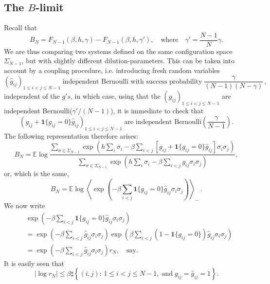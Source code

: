 \documentclass[a4paper,12pt,oneside,reqno]{amsart}
\numberwithin{equation}{section}
\begin{document}
\subsection{The $B$-limit} 
Recall that 
\[
B_N = F_{N-1}({\beta}, h, \gamma) - F_{N-1}({\beta}, h, \gamma'), \quad \text{where}\quad \gamma' = \frac{N-1}{N} \gamma.
\]
We are thus comparing two systems defined on the same configuration space $\Sigma_{N-1}$, but with slightly different dilution-parameters. This can be taken into account by a coupling procedure, i.e. introducing fresh random variables
$$(\hat g_{ij})_{1\leq i<j\leq N-1} \;    \text{independent Bernoulli with success probability}\;  \frac{\gamma}{(N-1)(N-\gamma)}\,,$$ 
independent of the $g's$, in which case, using that  the $ (g_{ij})_{1\leq i<j\leq N-1}$ are independent Bernoulli($\gamma'/\left(N-1\right) $), it is immediate to check that  
$$\left(g_{ij} + \boldsymbol{1}\{g_{ij} = 0\} \hat g_{ij}\right)_{1\leq i<j\leq N-1} \; \text{are independent Bernoulli}\left(\frac{\gamma}{ N-1} \right).$$
The following representation therefore arises: 
\[
B_N = {{\mathbb{E}}} \log \frac{\sum_{{\sigma} \in \Sigma_{N-1}} \exp\left( h \sum_i {\sigma}_i - {\beta} \sum_{i<j} \left[ g_{ij} + \boldsymbol{1}\{g_{ij} = 0\} \hat g_{ij} \right]  {\sigma}_i {\sigma}_j\right)  }{ \sum_{{\sigma} \in \Sigma_{N-1}} \exp\left(h \sum_i {\sigma}_i  - {\beta} \sum_{i<j} g_{ij} {\sigma}_i {\sigma}_j \right) },
\]
or, which is the same, 
\begin{equation} \label{reform_b}
B_N = {{\mathbb{E}}} \log \left< \exp\left( -  {\beta} \sum_{i<j}  \boldsymbol{1}\{g_{ij} = 0\} \hat g_{ij}  {\sigma}_i {\sigma}_j \right) \right>_- \,.
\end{equation}
We now write 
\begin{equation} \begin{aligned}
& \exp\left( -  {\beta} \sum_{i<j}  \boldsymbol{1}\{g_{ij} = 0\} \hat g_{ij}  {\sigma}_i {\sigma}_j \right)  \\
& = \exp\left( -  {\beta} \sum_{i<j} \hat g_{ij}  {\sigma}_i {\sigma}_j \right) \exp\left( {\beta} \sum_{i<j}  \left(1-\boldsymbol{1}\{g_{ij} = 0\}\right) \hat g_{ij}  {\sigma}_i {\sigma}_j \right)
\\
& = \exp\left( -  {\beta} \sum_{i<j} \hat g_{ij}  {\sigma}_i {\sigma}_j \right)
 r_N,\quad \text{say}.
\end{aligned} \end{equation}
It is easily seen that 
\begin{equation} \label{r_N}
\mid \log r_N \mid \leq {\beta} \sharp\left\{ (i,j): \, 1\leq i < j \leq N-1,\; \text{and}\; g_{ij} = \hat g_{ij} = 1 \right\}.
\end{equation}
\end{document}
